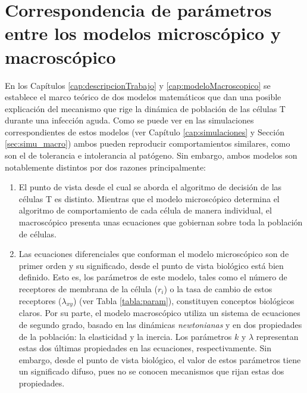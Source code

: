 \chapter{Correspondencia de parámetros entre los modelos microscópico y macroscópico}
\label{cap:redNeuronal}

En los Capítulos \ref{cap:descripcionTrabajo} y \ref{cap:modeloMacroscopico} se establece el marco teórico de dos modelos matemáticos que dan una posible explicación del mecanismo que rige la dinámica de población de las células T durante una infección aguda. Como se puede ver en las simulaciones correspondientes de estos modelos (ver Capítulo \ref{cap:simulaciones} y Sección \ref{sec:simu_macro}) ambos pueden reproducir comportamientos similares, como son el de tolerancia e intolerancia al patógeno. Sin embargo, ambos modelos son notablemente distintos por dos razones principalmente: 

\begin{enumerate}
	\item El punto de vista desde el cual se aborda el algoritmo de decisión de las células T es distinto. Mientras que el modelo microscópico determina el algoritmo de comportamiento de cada célula de manera individual, el macroscópico presenta unas ecuaciones que gobiernan sobre toda la población de células. 
	
	\item Las ecuaciones diferenciales que conforman el modelo microscópico son de primer orden y su significado, desde el punto de vista biológico está bien definido. Esto es, los parámetros de este modelo, tales como el número de receptores de membrana de la célula ($r_{i}$) o la tasa de cambio de estos receptores ($\lambda_{xy}$) (ver Tabla \ref{tabla:param}), constituyen conceptos biológicos claros. Por su parte, el modelo macroscópico utiliza un sistema de ecuaciones de segundo grado, basado en las dinámicas \textit{newtonianas} y en dos propiedades de la población: la elasticidad y la inercia. Los parámetros $k$ y $\lambda$ representan estas dos últimas propiedades en las ecuaciones, respectivamente. Sin embargo, desde el punto de vista biológico, el valor de estos parámetros tiene un significado difuso, pues no se conocen mecanismos que rijan estas dos propiedades.
	
\end{enumerate}

